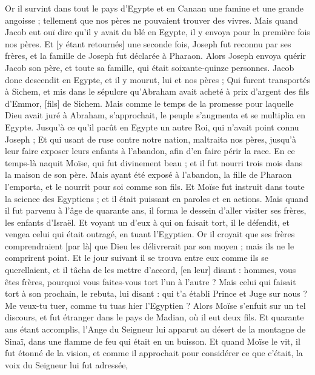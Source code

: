 \begin{multicols}{2}
Or il survint dans tout le pays d'Egypte et en Canaan une famine et une grande angoisse ; tellement que nos pères ne pouvaient trouver des vivres.
Mais quand Jacob eut ouï dire qu'il y avait du blé en Egypte, il y envoya pour la première fois nos pères.
Et [y étant retournés] une seconde fois, Joseph fut reconnu par ses frères, et la famille de Joseph fut déclarée à Pharaon.
Alors Joseph envoya quérir Jacob son père, et toute sa famille, qui était soixante-quinze personnes.
Jacob donc descendit en Egypte, et il y mourut, lui et nos pères ;
Qui furent transportés à Sichem, et mis dans le sépulcre qu'Abraham avait acheté à prix d'argent des fils d'Emmor, [fils] de Sichem.
Mais comme le temps de la promesse pour laquelle Dieu avait juré à Abraham, s'approchait, le peuple s'augmenta et se multiplia en Egypte.
Jusqu'à ce qu'il parût en Egypte un autre Roi, qui n'avait point connu Joseph ;
Et qui usant de ruse contre notre nation, maltraita nos pères, jusqu'à leur faire exposer leurs enfants à l'abandon, afin d'en faire périr la race.
En ce temps-là naquit Moïse, qui fut divinement beau ; et il fut nourri trois mois dans la maison de son père.
Mais ayant été exposé à l'abandon, la fille de Pharaon l'emporta, et le nourrit pour soi comme son fils.
Et Moïse fut instruit dans toute la science des Egyptiens ; et il était puissant en paroles et en actions.
Mais quand il fut parvenu à l'âge de quarante ans, il forma le dessein d'aller visiter ses frères, les enfants d'Israël.
Et voyant un d'eux à qui on faisait tort, il le défendit, et vengea celui qui était outragé, en tuant l'Egyptien.
Or il croyait que ses frères comprendraient [par là] que Dieu les délivrerait par son moyen ; mais ils ne le comprirent point.
Et le jour suivant il se trouva entre eux comme ils se querellaient, et il tâcha de les mettre d'accord, [en leur] disant : hommes, vous êtes frères, pourquoi vous faites-vous tort l'un à l'autre ?
Mais celui qui faisait tort à son prochain, le rebuta, lui disant : qui t'a établi Prince et Juge sur nous ?
Me veux-tu tuer, comme tu tuas hier l'Egyptien ?
Alors Moïse s'enfuit sur un tel discours, et fut étranger dans le pays de Madian, où il eut deux fils.
Et quarante ans étant accomplis, l'Ange du Seigneur lui apparut au désert de la montagne de Sinaï, dans une flamme de feu qui était en un buisson.
Et quand Moïse le vit, il fut étonné de la vision, et comme il approchait pour considérer ce que c'était, la voix du Seigneur lui fut adressée,

\end{multicols}
